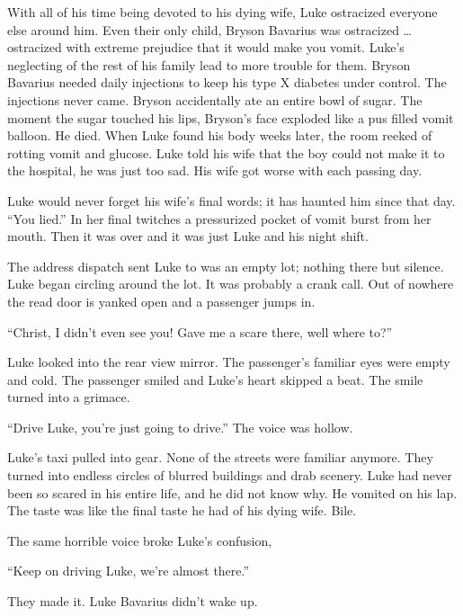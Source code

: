 With all of his time being devoted to his dying wife, Luke
ostracized everyone else around him. Even their only child, Bryson
Bavarius was ostracized {\ldots} ostracized with extreme prejudice
that it would make you vomit. Luke's neglecting of the rest
of his family lead to more trouble for them. Bryson Bavarius needed
daily injections to keep his type X diabetes under control. The
injections never came. Bryson accidentally ate an entire bowl of
sugar. The moment the sugar touched his lips, Bryson's face
exploded like a pus filled vomit balloon. He died. When Luke found
his body weeks later, the room reeked of rotting vomit and glucose.
Luke told his wife that the boy could not make it to the hospital,
he was just too sad. His wife got worse with each passing
day.



Luke would never forget his wife's final words; it has
haunted him since that day. ``You lied.'' In her final
twitches a pressurized pocket of vomit burst from her mouth. Then
it was over and it was just Luke and his night shift.



The address dispatch sent Luke to was an empty lot; nothing there
but silence. Luke began circling around the lot. It was probably a
crank call. Out of nowhere the read door is yanked open and a
passenger jumps in.

``Christ, I didn't even see you! Gave me a scare there,
well where to?''

Luke looked into the rear view mirror. The passenger's
familiar eyes were empty and cold. The passenger smiled and
Luke's heart skipped a beat. The smile turned into a
grimace.



``Drive Luke, you're just going to drive.'' The
voice was hollow.



Luke's taxi pulled into gear. None of the streets were
familiar anymore. They turned into endless circles of blurred
buildings and drab scenery. Luke had never been so scared in his
entire life, and he did not know why. He vomited on his lap. The
taste was like the final taste he had of his dying wife.
Bile.



The same horrible voice broke Luke's confusion,

``Keep on driving Luke, we're almost there.''



They made it. Luke Bavarius didn't wake up. 

